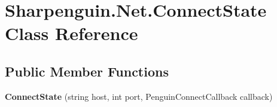 \hypertarget{classSharpenguin_1_1Net_1_1ConnectState}{\section{Sharpenguin.\-Net.\-Connect\-State Class Reference}
\label{classSharpenguin_1_1Net_1_1ConnectState}
}
\subsection*{Public Member Functions}
\begin{DoxyCompactItemize}
\item 
\hypertarget{classSharpenguin_1_1Net_1_1ConnectState_a0160852f7c7b54756bb977df3ee8c93d}{{\bfseries Connect\-State} (string host, int port, Penguin\-Connect\-Callback callback)}\label{classSharpenguin_1_1Net_1_1ConnectState_a0160852f7c7b54756bb977df3ee8c93d}

\end{DoxyCompactItemize}
